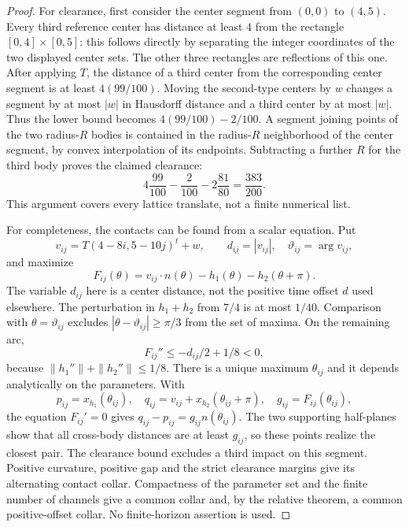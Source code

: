 \begin{proof}
For clearance, first consider the center segment from $(0,0)$ to $(4,5)$.
Every third reference center has distance at least $4$ from the rectangle
$[0,4]\times[0,5]$: this follows directly by separating the integer
coordinates of the two displayed center sets.  The other three rectangles
are reflections of this one.  After applying $T$, the distance of a third
center from the corresponding center segment is at least $4(99/100)$.
Moving the second-type centers by $w$ changes a segment by at most $|w|$
in Hausdorff distance and a third center by at most $|w|$.  Thus the
lower bound becomes $4(99/100)-2/100$.  A segment joining points of the
two radius-$R$ bodies is contained in the radius-$R$ neighborhood of the
center segment, by convex interpolation of its endpoints.  Subtracting a
further $R$ for the third body proves the claimed clearance:
\begin{equation}\label{eq:v44-clearance}
 4\frac{99}{100}-\frac2{100}-2\frac{81}{80}
                         =\frac{383}{200}.
\end{equation}
This argument covers every lattice translate, not a finite numerical list.

For completeness, the contacts can be found from a scalar equation.  Put
\[
 v_{ij}=T(4-8i,5-10j)^t+w,\qquad
 d_{ij}=|v_{ij}|,\quad \vartheta_{ij}=\arg v_{ij},
\]
and maximize
\begin{equation}\label{eq:v44-gap-function}
 F_{ij}(\theta)=v_{ij}\cdot n(\theta)-h_1(\theta)-h_2(\theta+\pi).
\end{equation}
The variable $d_{ij}$ here is a center distance, not the positive time
offset $d$ used elsewhere.  The perturbation in $h_1+h_2$ from $7/4$
is at most $1/40$.  Comparison with $\theta=\vartheta_{ij}$ excludes
$|\theta-\vartheta_{ij}|\ge\pi/3$ from the set of maxima.  On the
remaining arc,
\[
 F_{ij}''\le-d_{ij}/2+1/8<0,
\]
because $\|h_1''\|+\|h_2''\|\le1/8$.  There is a unique maximum
$\theta_{ij}$ and it depends analytically on the parameters.  With
\begin{equation}\label{eq:v44-contacts}
 p_{ij}=x_{h_1}(\theta_{ij}),\quad
 q_{ij}=v_{ij}+x_{h_2}(\theta_{ij}+\pi),\quad
 g_{ij}=F_{ij}(\theta_{ij}),
\end{equation}
the equation $F_{ij}'=0$ gives $q_{ij}-p_{ij}=g_{ij}n(\theta_{ij})$.
The two supporting half-planes show that all cross-body distances are at
least $g_{ij}$, so these points realize the closest pair.  The clearance
bound excludes a third impact on this segment.  Positive curvature,
positive gap and the strict clearance margins give its alternating
contact collar.  Compactness of the parameter set and the finite number
of channels give a common collar and, by the relative theorem, a common
positive-offset collar.  No finite-horizon assertion is used.


\end{proof}

